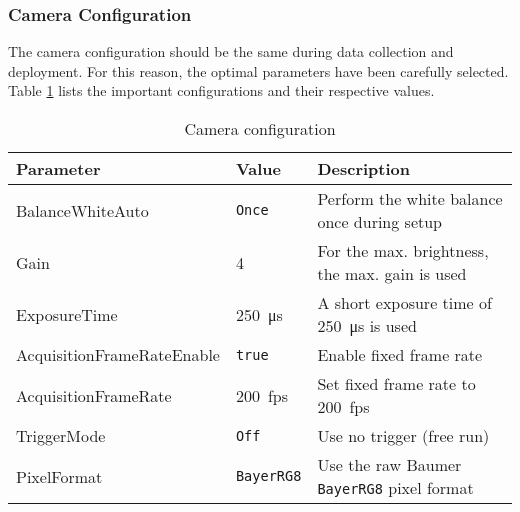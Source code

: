 \subsubsection{Camera Configuration}
\label{subsubsec:camera_configuration}

The camera configuration should be the same during data collection and deployment.
For this reason, the optimal parameters have been carefully selected.
Table \ref{tab:config} lists the important configurations and their respective values.

\begin{table}[hb]
  \caption{Camera configuration}
  \label{tab:config}
  \centering
  \begin{tabular}{lll}
    \toprule
    \textbf{Parameter} & \textbf{Value} & \textbf{Description} \\
    \midrule
    BalanceWhiteAuto & \texttt{Once} & Perform the white balance once during setup \\
    Gain & 4 & For the max. brightness, the max. gain is used \\
    ExposureTime & \SI{250}{\micro\second} & A short exposure time of \SI{250}{\micro\second} is used \\
    AcquisitionFrameRateEnable & \texttt{true} & Enable fixed frame rate \\
    AcquisitionFrameRate & \SI{200}{fps} & Set fixed frame rate to \SI{200}{fps} \\
    TriggerMode & \texttt{Off} & Use no trigger (free run) \\
    PixelFormat & \texttt{BayerRG8} & Use the raw Baumer \texttt{BayerRG8} pixel format \\
    \bottomrule
  \end{tabular}
\end{table}

